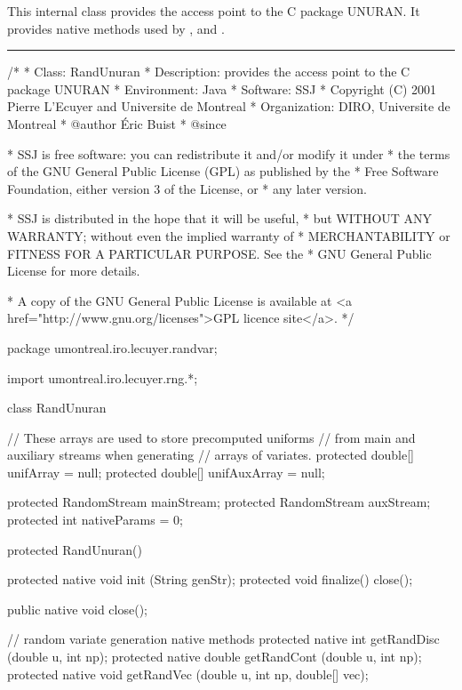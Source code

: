 
This internal class provides the access point to the C
package UNURAN.  It provides native methods used
by ,  and
.

\bigskip\hrule

\begin{code}
\begin{hide}
/*
 * Class:        RandUnuran
 * Description:  provides the access point to the C package UNURAN
 * Environment:  Java
 * Software:     SSJ
 * Copyright (C) 2001  Pierre L'Ecuyer and Universite de Montreal
 * Organization: DIRO, Universite de Montreal
 * @author       Éric Buist
 * @since

 * SSJ is free software: you can redistribute it and/or modify it under
 * the terms of the GNU General Public License (GPL) as published by the
 * Free Software Foundation, either version 3 of the License, or
 * any later version.

 * SSJ is distributed in the hope that it will be useful,
 * but WITHOUT ANY WARRANTY; without even the implied warranty of
 * MERCHANTABILITY or FITNESS FOR A PARTICULAR PURPOSE.  See the
 * GNU General Public License for more details.

 * A copy of the GNU General Public License is available at
   <a href="http://www.gnu.org/licenses">GPL licence site</a>.
 */
\end{hide}
package umontreal.iro.lecuyer.randvar;\begin{hide}
import umontreal.iro.lecuyer.rng.*;
\end{hide}

class RandUnuran\begin{hide} {

   // These arrays are used to store precomputed uniforms
   // from main and auxiliary streams when generating
   // arrays of variates.
   protected double[] unifArray = null;
   protected double[] unifAuxArray = null;

   protected RandomStream mainStream;
   protected RandomStream auxStream;
   protected int nativeParams = 0;

   protected RandUnuran() {}

   protected native void init (String genStr);
   protected void finalize() {
      close();
   }

   public native void close();

   // random variate generation native methods
   protected native int getRandDisc (double u, int np);
   protected native double getRandCont (double u, int np);
   protected native void getRandVec (double u, int np, double[] vec);

}
\end{hide}
\end{code}
